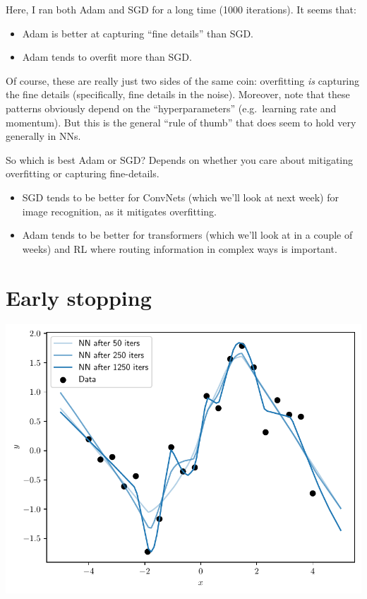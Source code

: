 \documentclass{article}
\newcommand{\0}{\mathbf{0}}
\begin{document}
Here, I ran both Adam and SGD for a long time (1000 iterations).
It seems that:
\begin{itemize}
  \item Adam is better at capturing ``fine details'' than SGD.
  \item Adam tends to overfit more than SGD.
\end{itemize}
Of course, these are really just two sides of the same coin: overfitting \textit{is} capturing the fine details (specifically, fine details in the noise).
Moreover, note that these patterns obviously depend on the ``hyperparameters'' (e.g.\ learning rate and momentum).  
But this is the general ``rule of thumb'' that does seem to hold very generally in NNs.

So which is best Adam or SGD?  Depends on whether you care about mitigating overfitting or capturing fine-details.
\begin{itemize}
  \item SGD tends to be better for ConvNets (which we'll look at next week) for image recognition, as it mitigates overfitting.
  \item Adam tends to be better for transformers (which we'll look at in a couple of weeks) and RL where routing information in complex ways is important.
\end{itemize}

\newpage
\section{Early stopping}

\includegraphics[width=\textwidth]{early_stopping.pdf}
\end{document}
